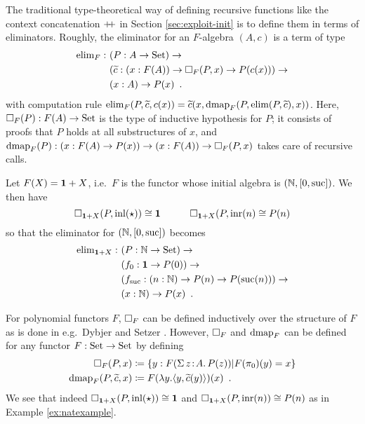 \documentclass[orivec,envcountsame, ,envcountsect]{llncs}
\begin{document}
The traditional type-theoretical way of defining recursive functions
like the context concatenation $\mathbin{+\mkern-6mu+}$ in Section
\ref{sec:exploit-init} is to define them in terms of eliminators.
Roughly, the eliminator for an $F$-algebra $(A, c)$ is a term of type
\begin{align*}
\text{elim}_F :\ & (P : A \to \text{Set}) \to \\
         & (\widetilde{c} : (x : F(A)) \to \Box_F(P, x) \to P(c(x))) \to \\
         & (x : A) \to P(x) \enspace .
\end{align*}
with computation rule $\text{elim}_F(P, \widetilde{c}, c(x)) = \widetilde{c}(x, \text{dmap}_F(P,
\text{elim}(P, \widetilde{c}), x))$. Here, $\Box_F(P) : F(A) \to \text{Set}$ is the type of
inductive hypothesis for $P$; it consists of proofs that $P$ holds at
all substructures of $x$, and $\text{dmap}_F(P) : (x : F(A) \to P(x)) \to (x :
F(A)) \to \Box_F(P, x)$ takes care of recursive calls.

\begin{example}
\label{ex:natexample}
  Let $F(X) = \mathbf{1} + X$, i.e.\ $F$ is the functor whose initial
  algebra is $(\mathbb{N}, [0, \text{suc}])$.  We then have
\[ %
  \BOX_{\one + X}(P, \inl(\oneelt)) \cong \one \qquad\quad
  \BOX_{\one + X}(P, \inr(n) \cong P(n)
\] %
so that the eliminator for $(\mathbb{N}, [0, \text{suc}])$ becomes
\begin{align*}
\text{elim}_{\mathbf{1} + X} :\ & (P : \mathbb{N} \to \text{Set}) \to \\
         & (f_0 : \mathbf{1} \to P(0)) \to \\
         & (f_{\text{suc}} : (n : \mathbb{N}) \to P(n) \to P(\text{suc}(n))) \to \\
         & (x : \mathbb{N}) \to P(x) \enspace .
\end{align*}

\end{example}

For polynomial functors $F$, $\Box_F$ can be defined inductively over
the structure of $F$ as is done in e.g.\ Dybjer and Setzer
\cite{dybjersetzer2003inalg}. However, $\Box_F$ and $\text{dmap}_F$ can be
defined for any functor $F : \text{Set} \to \text{Set}$ by defining
\begin{align*}
  \Box_F(P, x) &\coloneqq \{ y : F(\Sigma\,z\!:\!A .\,P(z)) | F(\pi_0)(y) = x\} \\
  \text{dmap}_F(P, \widetilde{c}, x) &\coloneqq F(\lambda y . \langle y, \widetilde{c}(y)\rangle)(x) \enspace .
\end{align*}
We see that indeed $\Box_{\mathbf{1} + X}(P, \text{inl}(\star)) \cong \mathbf{1}$ and
$\Box_{\mathbf{1} + X}(P, \text{inr}(n)) \cong P(n)$ as in Example \ref{ex:natexample}.
\end{document}

